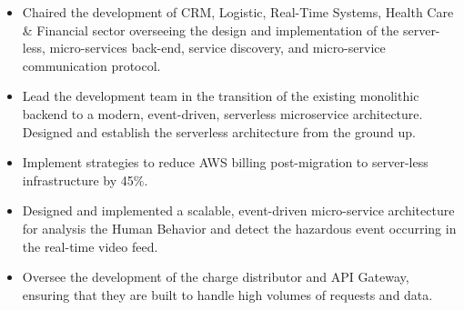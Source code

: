 \documentclass[10pt,a4paper,ragged2e]{classes/altacv}
\begin{document}
\tagline{ }

\begin{fullwidth}
\makecvheader
\end{fullwidth}




\begin{itemize}
\item Chaired the development of CRM, Logistic, Real-Time Systems, Health Care \& Financial sector overseeing the design and implementation of the server-less, micro-services back-end, service discovery, and micro-service communication protocol.
\item Lead the development team in the transition of the existing monolithic backend to a modern, event-driven, serverless microservice architecture. Designed and establish the serverless architecture from the ground up.
\item Implement strategies to reduce AWS billing post-migration to server-less infrastructure by 45\%.

\end{itemize}

\divider

\begin{itemize}
\item Designed and implemented a scalable, event-driven micro-service architecture for analysis the Human Behavior and detect the hazardous event occurring in the real-time video feed.
\item Oversee the development of the charge distributor and API Gateway, ensuring that they are built to handle high volumes of requests and data.
\end{itemize}
\end{document}
